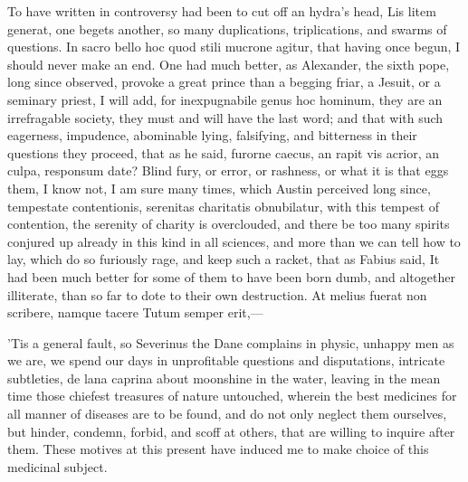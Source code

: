 {To have written in controversy had been to cut off an hydra's head,
Lis litem generat, one begets another, so many duplications,
triplications, and swarms of questions. In sacro bello hoc quod stili
mucrone agitur, that having once begun, I should never make an end. One
had much better, as Alexander, the sixth pope, long since
observed, provoke a great prince than a begging friar, a Jesuit, or a
seminary priest, I will add, for inexpugnabile genus hoc hominum, they
are an irrefragable society, they must and will have the last word; and
that with such eagerness, impudence, abominable lying, falsifying, and
bitterness in their questions they proceed, that as he said,
furorne caecus, an rapit vis acrior, an culpa, responsum date? Blind
fury, or error, or rashness, or what it is that eggs them, I know not,
I am sure many times, which Austin perceived long since,
tempestate contentionis, serenitas charitatis obnubilatur, with this
tempest of contention, the serenity of charity is overclouded, and
there be too many spirits conjured up already in this kind in all
sciences, and more than we can tell how to lay, which do so furiously
rage, and keep such a racket, that as Fabius said, It had been
much better for some of them to have been born dumb, and altogether
illiterate, than so far to dote to their own destruction.
At melius fuerat non scribere, namque tacere
Tutum semper erit,---

'Tis a general fault, so Severinus the Dane complains in physic,
unhappy men as we are, we spend our days in unprofitable questions and
disputations, intricate subtleties, de lana caprina about moonshine in
the water, leaving in the mean time those chiefest treasures of nature
untouched, wherein the best medicines for all manner of diseases are to
be found, and do not only neglect them ourselves, but hinder, condemn,
forbid, and scoff at others, that are willing to inquire after them.
These motives at this present have induced me to make choice of this
medicinal subject.

}
